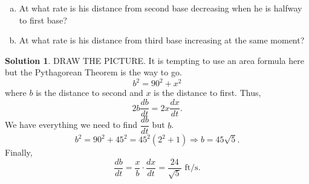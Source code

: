 \documentclass[10pt]{article}
\theoremstyle{Theorem}
\theoremstyle{definition}
\newtheorem*{solution}{Solution}
\theoremstyle{remark}
\theoremstyle{custom}
\begin{document}
\begin{enumerate}[1.]
\begin{enumerate}[a.]
\item At what rate is his distance from second base decreasing when he is halfway to first base?
\item At what rate is his distance from third base increasing at the same moment?
\end{enumerate}
\begin{solution}
DRAW THE PICTURE. It is tempting to use an area formula here but the Pythagorean Theorem is the way to go.
\[
b^2=90^2+x^2
\]
where $b$ is the distance to second and $x$ is the distance to first. Thus,
\[
2b\dfrac{db}{dt}=2x\dfrac{dx}{dt}.
\]
We have everything we need to find $\dfrac{db}{dt}$ but $b$. 
\[
b^2=90^2+45^2=45^2(2^2+1) \Rightarrow b=45\sqrt{5}.
\]
Finally,
\[
\dfrac{db}{dt}=\dfrac{x}{b}\cdot \dfrac{dx}{dt}=\dfrac{24}{\sqrt{5}}\text{ ft/s}.
\]
\end{solution}
\end{enumerate}
\end{document}
